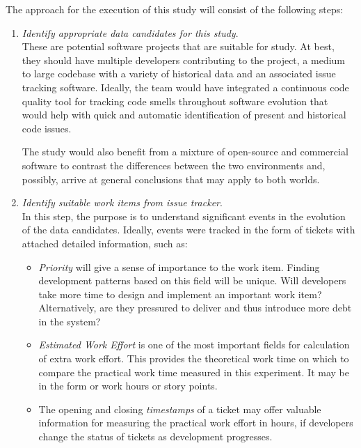 \documentclass{mprop}
\begin{document}
The approach for the execution of this study will consist of the following
steps:
\begin{enumerate}
	\item \textit{Identify appropriate data candidates for this study}.\\
	      These are potential software projects that are suitable for study. At
	      best, they should have multiple developers contributing to the
	      project, a medium to large codebase with a variety of historical data
	      and an associated issue tracking software. Ideally, the team would
	      have integrated a continuous code quality tool for tracking code
	      smells throughout software evolution that would help with quick and
	      automatic identification of present and historical code issues.

	      The study would also benefit from a mixture of open-source and
	      commercial software to contrast the differences between the two
	      environments and, possibly, arrive at general conclusions that may
	      apply to both worlds.

	\item \textit{Identify suitable work items from issue tracker}.\\
	      In this step, the purpose is to understand significant events in the
	      evolution of the data candidates. Ideally, events were tracked in the
	      form of tickets with attached detailed information, such as:
	      \begin{itemize}
		      \item \textit{Priority} will give a sense of importance to the work item.
		      Finding development patterns based on this field will be unique.
		      Will developers take more time to design and implement an
		      important work item? Alternatively, are they pressured to deliver
		      and thus introduce more debt in the system?
		      \item \textit{Estimated Work Effort} is one of the most important
		      fields for calculation of extra work effort. This provides the
		      theoretical work time on which to compare the practical work time
		      measured in this experiment. It may be in the form or work hours
		      or story points.
		      \item The opening and closing \textit{timestamps} of a ticket may
		      offer valuable information for measuring the practical work effort
		      in hours, if developers change the status of tickets as
		      development progresses.
	      \end{itemize}


\end{enumerate}
\end{document}
